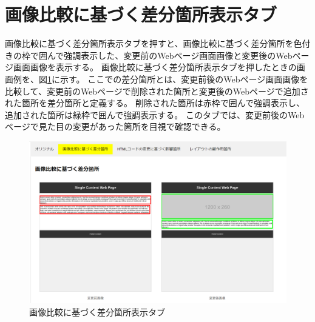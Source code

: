 \section{画像比較に基づく差分箇所表示タブ}\label{subsec:images_tab}
画像比較に基づく差分箇所表示タブを押すと、画像比較に基づく差分箇所を色付きの枠で囲んで強調表示した、変更前のWebページ画面画像と変更後のWebページ画面画像を表示する。
画像比較に基づく差分箇所表示タブを押したときの画面例を、図\ref{fig: Appearance_images_tab}に示す。
ここでの差分箇所とは、変更前後のWebページ画面画像を比較して、変更前のWebページで削除された箇所と変更後のWebページで追加された箇所を差分箇所と定義する。
削除された箇所は赤枠で囲んで強調表示し、追加された箇所は緑枠で囲んで強調表示する。
このタブでは、変更前後のWebページで見た目の変更があった箇所を目視で確認できる。
\begin{figure}[tp]
    \begin{center}
        \includegraphics[width=1.0\columnwidth]{image/3_images_tab.png}
        \caption{画像比較に基づく差分箇所表示タブ}
        \label{fig: Appearance_images_tab}
    \end{center}
\end{figure}




